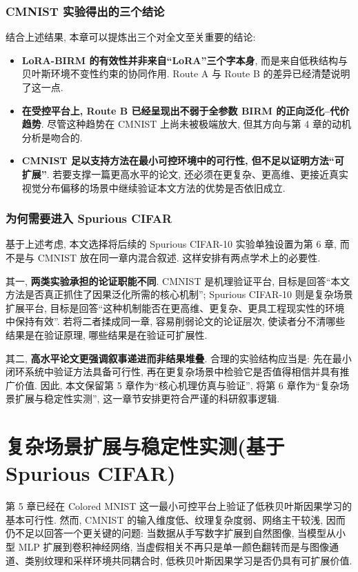 \documentclass[a4paper,punct=banjiao,twoside]{ctexrep}
\theoremstyle{plain}
\theoremstyle{definition}
\theoremstyle{remark}
\begin{document}
\subsection{CMNIST 实验得出的三个结论}
结合上述结果, 本章可以提炼出三个对全文至关重要的结论:
\begin{itemize}
    \item \textbf{LoRA-BIRM 的有效性并非来自“LoRA”三个字本身}, 而是来自低秩结构与贝叶斯环境不变性约束的协同作用. Route A 与 Route B 的差异已经清楚说明了这一点.
    \item \textbf{在受控平台上, Route B 已经呈现出不弱于全参数 BIRM 的正向泛化--代价趋势}. 尽管这种趋势在 CMNIST 上尚未被极端放大, 但其方向与第 4 章的动机分析是吻合的.
    \item \textbf{CMNIST 足以支持方法在最小可控环境中的可行性, 但不足以证明方法“可扩展”}. 若要支撑一篇更高水平的论文, 还必须在更复杂、更高维、更接近真实视觉分布偏移的场景中继续验证本文方法的优势是否依旧成立.
\end{itemize}

\subsection{为何需要进入 Spurious CIFAR}
基于上述考虑, 本文选择将后续的 Spurious CIFAR-10 实验单独设置为第 6 章, 而不是与 CMNIST 放在同一章内混合叙述. 这样安排有两点学术上的必要性.

其一, \textbf{两类实验承担的论证职能不同}. CMNIST 是机理验证平台, 目标是回答“本文方法是否真正抓住了因果泛化所需的核心机制”; Spurious CIFAR-10 则是复杂场景扩展平台, 目标是回答“这种机制能否在更高维、更复杂、更具工程现实性的环境中保持有效”. 若将二者揉成同一章, 容易削弱论文的论证层次, 使读者分不清哪些结果是在验证原理, 哪些结果是在验证可扩展性.

其二, \textbf{高水平论文更强调叙事递进而非结果堆叠}. 合理的实验结构应当是: 先在最小闭环系统中验证方法具备可行性, 再在更复杂场景中检验它是否值得相信并具有推广价值. 因此, 本文保留第 5 章作为“核心机理仿真与验证”, 将第 6 章作为“复杂场景扩展与稳定性实测”, 这一章节安排更符合严谨的科研叙事逻辑.



\chapter{复杂场景扩展与稳定性实测(基于 Spurious CIFAR)}

第 5 章已经在 Colored MNIST 这一最小可控平台上验证了低秩贝叶斯因果学习的基本可行性. 然而, CMNIST 的输入维度低、纹理复杂度弱、网络主干较浅, 因而仍不足以回答一个更关键的问题: 当数据从手写数字扩展到自然图像, 当模型从小型 MLP 扩展到卷积神经网络, 当虚假相关不再只是单一颜色翻转而是与图像通道、类别纹理和采样环境共同耦合时, 低秩贝叶斯因果学习是否仍具有可扩展价值.
\end{document}
